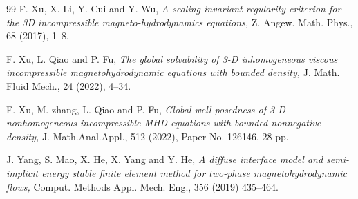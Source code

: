 \documentclass[11pt]{article}
\numberwithin{equation}{section}
\begin{document}
\begin{center}
\begin{thebibliography}{99}
 F. Xu, X. Li, Y. Cui and Y. Wu, {\it A scaling invariant regularity criterion for the 3D incompressible
magneto-hydrodynamics equations,} Z. Angew. Math. Phys., 68 (2017), 1--8.


 F. Xu, L. Qiao and P. Fu,
  {\it  The global solvability of 3-D inhomogeneous viscous incompressible magnetohydrodynamic equations with bounded
density,} J. Math. Fluid Mech., 24 (2022), 4--34.

 F. Xu, M. zhang, L. Qiao and P. Fu,
  {\it  Global well-posedness of 3-D nonhomogeneous incompressible MHD equations with bounded nonnegative density,}
J. Math.Anal.Appl., 512 (2022),  Paper No. 126146, 28 pp.



 J. Yang, S. Mao, X. He, X. Yang and  Y. He, {\it A diffuse interface model and semi-implicit energy stable finite
element method for two-phase magnetohydrodynamic flows,} Comput. Methods Appl. Mech. Eng., 356 (2019) 435--464.


\end{thebibliography}
\end{center}
\end{document}
